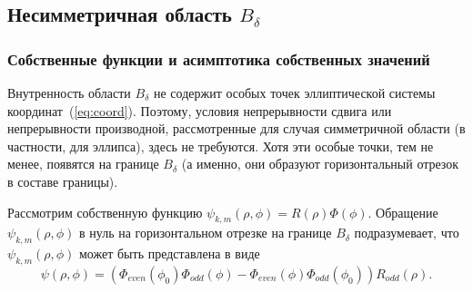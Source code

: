 \subsection{Несимметричная область $B_\delta$}\label{sec:ch2/sec2/sub2}
\subsubsection{Собственные функции и асимптотика собственных значений}\label{sec:ch2/sec2/sub2/sub1}


Внутренность области $B_\delta$ не содержит особых точек эллиптической системы координат~(\ref{eq:coord}). Поэтому, условия непрерывности сдвига или непрерывности производной, рассмотренные для случая симметричной области (в частности, для эллипса), здесь не требуются.
Хотя эти особые точки, тем не менее, появятся на границе  $B_\delta$ (а именно, они образуют горизонтальный отрезок в составе границы).

Рассмотрим собственную функцию $\psi_{k,m}(\rho,\phi) = R(\rho)\Phi(\phi)$.
Обращение  $\psi_{k,m}(\rho,\phi) $ в нуль на горизонтальном отрезке на границе  $B_\delta$
подразумевает, что $\psi_{k,m}(\rho,\phi)$ может быть представлена в виде
\[
\psi(\rho,\phi) = 
    \left(
    \Phi_{even}(\phi_0) \Phi_{odd}(\phi) - \Phi_{even}(\phi) \Phi_{odd}(\phi_0) 
    \right) R_{odd}(\rho).
\]

